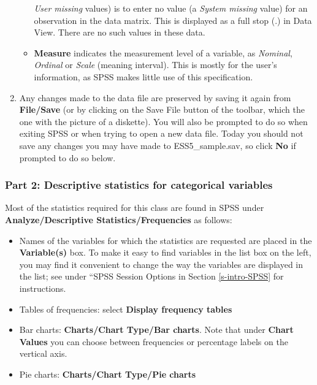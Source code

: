 \documentclass[11pt,a4paper,openany]{book}
\begin{document}
\begin{enumerate}
\begin{itemize}
    \emph{User missing} values) is to enter no value (a \emph{System
    missing} value) for an observation in the data matrix. This is
    displayed as a full stop (.) in Data View. There are no such values
    in these data.
  \item
    \textbf{Measure} indicates the measurement level of a variable, as
    \emph{Nominal}, \emph{Ordinal} or \emph{Scale} (meaning interval).
    This is mostly for the user's information, as SPSS makes little use
    of this specification.
  \end{itemize}
\item
  Any changes made to the data file are preserved by saving it again
  from \textbf{File/Save} (or by clicking on the Save File button of the
  toolbar, which the one with the picture of a diskette). You will also
  be prompted to do so when exiting SPSS or when trying to open a new
  data file. Today you should not save any changes you may have made to
  ESS5\_sample.sav, so click \textbf{No} if prompted to do so below.
\end{enumerate}

\subsubsection*{Part 2: Descriptive statistics for categorical
variables}\label{part-2-descriptive-statistics-for-categorical-variables}

Most of the statistics required for this class are found in SPSS under
\textbf{Analyze/Descriptive Statistics/Frequencies} as follows:

\begin{itemize}
\item
  Names of the variables for which the statistics are requested are
  placed in the \textbf{Variable(s)} box. To make it easy to find
  variables in the list box on the left, you may find it convenient to
  change the way the variables are displayed in the list; see under
  ``SPSS Session Options in Section \ref{s-intro-SPSS} for instructions.
\item
  Tables of frequencies: select \textbf{Display frequency tables}
\item
  Bar charts: \textbf{Charts/Chart Type/Bar charts}. Note that under
  \textbf{Chart Values} you can choose between frequencies or percentage
  labels on the vertical axis.
\item
  Pie charts: \textbf{Charts/Chart Type/Pie charts}
\end{itemize}
\end{document}
